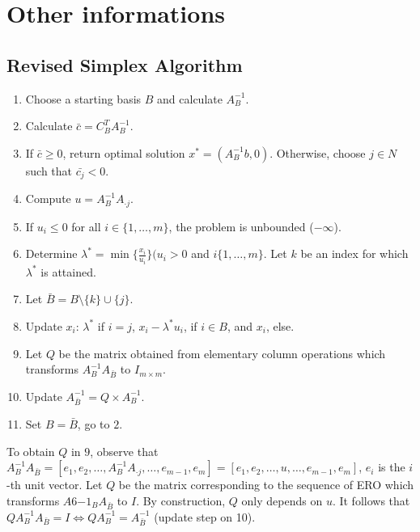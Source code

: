 \documentclass[main]{subfiles}
\begin{document}

\section{Other informations}
\subsection{Revised Simplex Algorithm}

\begin{enumerate}
\item Choose a starting basis $B$ and calculate $A^{-1}_B$.
\item Calculate $\bar{c} = C^T_B A^{-1}_B$.
\item If $\bar{c} \geq 0$, return optimal solution $x^* = (A^{-1}_B b, 0)$.
Otherwise, choose $j \in N$ such that $\bar{c_j} < 0$.
\item Compute $u = A^{-1}_B A_{\cdot j}$.
\item If $u_i \leq 0$ for all $i \in \{1, \dots, m\}$, the problem is unbounded
($-\infty$).
\item Determine $\lambda^* = \min \{ \frac{x_i}{u_i}\} (u_i>0$ and $i \{ 1,
\dots, m\}$. Let $k$ be an index for which $\lambda^*$ is attained.
\item Let $\bar{B} = B\setminus\{k\} \cup \{j\}$.
\item Update $x_i$: $\lambda^*$ if $i=j$, $x_i - \lambda^* u_i$, if $i \in B$,
and $x_i$, else.
\item Let $Q$ be the matrix obtained from elementary column operations which
transforms $A^{-1}_B A_{\bar{B}}$ to $I_{m \times m}$.
\item Update $A^{-1}_{\bar{B}} = Q \times A^{-1}_B$.
\item Set $B = \bar{B}$, go to $2$.
\end{enumerate}

To obtain $Q$ in $9$, observe that $A^{-1}_B A_{\bar{B}} = [e_1, e_2, \dots,
A^{-1}_B A_{\cdot j}, \dots, e_{m-1}, e_m] = [e_1, e_2, \dots, u, \dots,
e_{m-1}, e_m]$, $e_i$ is the $i$-th unit vector. Let $Q$ be the matrix
corresponding to the sequence of ERO which transforms $A6 {-1}_B A_{\bar{B}}$
to $I$. By construction, $Q$ only depends on $u$. It follows that $Q A^{-1}_B
A_{\bar{B}} = I \iff Q A^{-1}_B = A^{-1}_{\bar{B}}$ (update step on 10).
\end{document}
